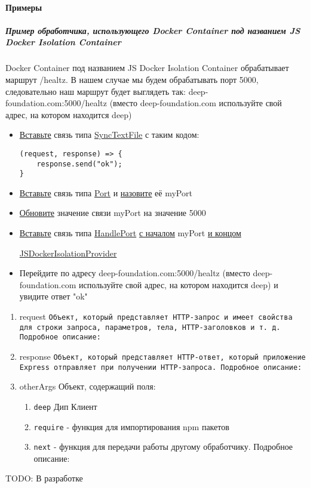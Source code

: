 \documentclass{article}
\begin{document}
\paragraph{Примеры}
\subparagraph{Пример обработчика, использующего Docker Container под названием
  JS Docker Isolation Container}
Docker Container под названием JS Docker Isolation Container обрабатывает
маршрут /healtz. В нашем случае мы будем обрабатывать порт 5000, следовательно
наш маршрут будет выглядеть так: deep-foundation.com:5000/healtz (вместо
deep-foundation.com используйте свой адрес, на котором находится deep)
\begin{itemize}
  \item \hyperlink{DeepCase.InsertLink.Description}{Вставьте} связь типа
        \hyperlink{Core.SyncTextFile.Description}{SyncTextFile} с таким
        кодом:
        \begin{lstlisting}
(request, response) => {
    response.send("ok");
}
\end{lstlisting}
  \item \hyperlink{DeepCase.InsertLink.Description}{Вставьте} связь типа
        \hyperlink{Core.Port.Description}{Port} и
        \hyperlink{FAQ.HowToSetName}{назовите} её myPort
  \item \hyperlink{DeepCase.UpdateLink.Description}{Обновите} значение
        связи
        myPort на значение 5000
  \item \hyperlink{DeepCase.InsertLink.Description}{Вставьте} связь типа
        \hyperlink{Core.HandlePort.Description}{HandlePort} \hyperlink{FAQ.HowToInsertLinkWithFromAndTo}{с началом}
        myPort \hyperlink{FAQ.HowToInsertLinkWithFromAndTo}{и концом}

        \hyperlink{Core.JSDockerIsolationProvider.Description}{JSDockerIsolationProvider}
  \item Перейдите по адресу deep-foundation.com:5000/healtz (вместо
        deep-foundation.com используйте свой адрес, на котором находится
        deep) и
        увидите ответ "ok" %
\end{itemize}

\begin{enumerate}
  \item{request} \texttt{Объект, который представляет HTTP-запрос и имеет
    свойства для
    строки запроса, параметров, тела, HTTP-заголовков и т. д. Подробное
    описание:
    \requrl}
  \item{response} \texttt{Объект, который представляет HTTP-ответ, который
    приложение
    Express отправляет при получении HTTP-запроса. Подробное описание:
    \resurl}
  \item{otherArgs} Объект, содержащий поля:
  \begin{enumerate}
    \item \texttt{deep} Дип Клиент
    \item \texttt{require} - функция для импортирования npm пакетов
    \item \texttt{next} - функция для передачи работы другому
          обработчику. Подробное описание: \midwareurl
  \end{enumerate}
\end{enumerate}
TODO: В разработке
\end{document}
